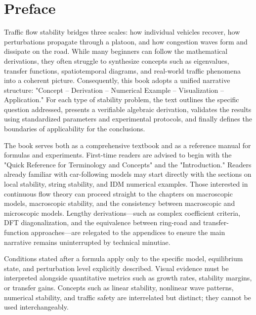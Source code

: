 \documentclass[11pt,a4paper,openany]{book}
\numberwithin{equation}{chapter}
\numberwithin{figure}{chapter}
\numberwithin{table}{chapter}
\begin{document}
\chapter*{Preface}
Traffic flow stability bridges three scales: how individual vehicles recover, how perturbations propagate through a platoon, and how congestion waves form and dissipate on the road. While many beginners can follow the mathematical derivations, they often struggle to synthesize concepts such as eigenvalues, transfer functions, spatiotemporal diagrams, and real-world traffic phenomena into a coherent picture. Consequently, this book adopts a unified narrative structure: "Concept – Derivation – Numerical Example – Visualization – Application." For each type of stability problem, the text outlines the specific question addressed, presents a verifiable algebraic derivation, validates the results using standardized parameters and experimental protocols, and finally defines the boundaries of applicability for the conclusions.

The book serves both as a comprehensive textbook and as a reference manual for formulas and experiments. First-time readers are advised to begin with the "Quick Reference for Terminology and Concepts" and the "Introduction." Readers already familiar with car-following models may start directly with the sections on local stability, string stability, and IDM numerical examples. Those interested in continuous flow theory can proceed straight to the chapters on macroscopic models, macroscopic stability, and the consistency between macroscopic and microscopic models. Lengthy derivations—such as complex coefficient criteria, DFT diagonalization, and the equivalence between ring-road and transfer-function approaches—are relegated to the appendices to ensure the main narrative remains uninterrupted by technical minutiae.

\begin{tcolorbox}[chapterguide,title=\textbf{Reading Conventions}]
Conditions stated after a formula apply only to the specific model, equilibrium state, and perturbation level explicitly described. Visual evidence must be interpreted alongside quantitative metrics such as growth rates, stability margins, or transfer gains. Concepts such as linear stability, nonlinear wave patterns, numerical stability, and traffic safety are interrelated but distinct; they cannot be used interchangeably.

\end{tcolorbox}
\clearpage
\end{document}
